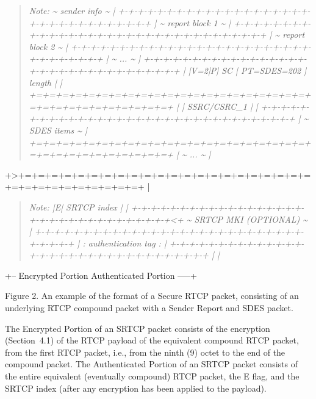 \documentclass{article}
\begin{document}
\begin{quote}
\textit{Note: \textasciitilde{}                          sender info                          \textasciitilde{} | +-+-+-+-+-+-+-+-+-+-+-+-+-+-+-+-+-+-+-+-+-+-+-+-+-+-+-+-+-+-+-+-+ | \textasciitilde{}                         report block 1                        \textasciitilde{} | +-+-+-+-+-+-+-+-+-+-+-+-+-+-+-+-+-+-+-+-+-+-+-+-+-+-+-+-+-+-+-+-+ | \textasciitilde{}                         report block 2                        \textasciitilde{} | +-+-+-+-+-+-+-+-+-+-+-+-+-+-+-+-+-+-+-+-+-+-+-+-+-+-+-+-+-+-+-+-+ | \textasciitilde{}                              ...                              \textasciitilde{} | +-+-+-+-+-+-+-+-+-+-+-+-+-+-+-+-+-+-+-+-+-+-+-+-+-+-+-+-+-+-+-+-+ | |V=2|P|    SC   |  PT=SDES=202  |             length            | | +=+=+=+=+=+=+=+=+=+=+=+=+=+=+=+=+=+=+=+=+=+=+=+=+=+=+=+=+=+=+=+=+ | |                          SSRC/CSRC\_1                          | | +-+-+-+-+-+-+-+-+-+-+-+-+-+-+-+-+-+-+-+-+-+-+-+-+-+-+-+-+-+-+-+-+ | \textasciitilde{}                           SDES items                          \textasciitilde{} | +=+=+=+=+=+=+=+=+=+=+=+=+=+=+=+=+=+=+=+=+=+=+=+=+=+=+=+=+=+=+=+=+ | \textasciitilde{}                              ...                              \textasciitilde{} |}
\end{quote}

+>+=+=+=+=+=+=+=+=+=+=+=+=+=+=+=+=+=+=+=+=+=+=+=+=+=+=+=+=+=+=+=+=+ |

\begin{quote}
\textit{Note: |E|                         SRTCP index                         | | +-+-+-+-+-+-+-+-+-+-+-+-+-+-+-+-+-+-+-+-+-+-+-+-+-+-+-+-+-+-+-+-+<+ \textasciitilde{}                     SRTCP MKI (OPTIONAL)                      \textasciitilde{} | +-+-+-+-+-+-+-+-+-+-+-+-+-+-+-+-+-+-+-+-+-+-+-+-+-+-+-+-+-+-+-+-+ | :                     authentication tag                        : | +-+-+-+-+-+-+-+-+-+-+-+-+-+-+-+-+-+-+-+-+-+-+-+-+-+-+-+-+-+-+-+-+ | |}
\end{quote}

+-- Encrypted Portion                    Authenticated Portion -----+

Figure 2.  An example of the format of a Secure RTCP packet, consisting of an underlying RTCP compound packet with a Sender Report and SDES packet.

The Encrypted Portion of an SRTCP packet consists of the encryption (Section~4.1) of the RTCP payload of the equivalent compound RTCP packet, from the first RTCP packet, i.e., from the ninth (9) octet to the end of the compound packet.  The Authenticated Portion of an SRTCP packet consists of the entire equivalent (eventually compound) RTCP packet, the E flag, and the SRTCP index (after any encryption has been applied to the payload).
\end{document}
